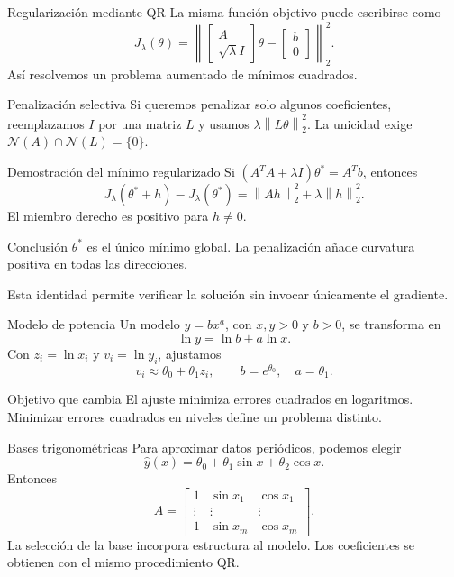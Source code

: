 \documentclass[aspectratio=169,12pt]{beamer}
\newcommand{\mat}[1]{\begin{bmatrix}#1\end{bmatrix}}
\newcommand{\norm}[1]{\left\lVert#1\right\rVert}
\begin{document}
\begin{frame}{Regularización mediante QR}
La misma función objetivo puede escribirse como
\[
J_\lambda(\theta)
=\left\lVert
\mat{A\\\sqrt\lambda I}\theta-\mat{b\\0}
\right\rVert_2^2.
\]
Así resolvemos un problema aumentado de mínimos cuadrados.
\begin{block}{Penalización selectiva}
Si queremos penalizar solo algunos coeficientes, reemplazamos $I$ por una
matriz $L$ y usamos $\lambda\norm{L\theta}_2^2$.
La unicidad exige $\mathcal N(A)\cap\mathcal N(L)=\{0\}$.
\end{block}
\end{frame}

\begin{frame}{Demostración del mínimo regularizado}
Si $(A^TA+\lambda I)\theta^*=A^Tb$, entonces
\[
J_\lambda(\theta^*+h)-J_\lambda(\theta^*)
=\norm{Ah}_2^2+\lambda\norm{h}_2^2.
\]
El miembro derecho es positivo para $h\neq0$.
\begin{block}{Conclusión}
$\theta^*$ es el único mínimo global. La penalización añade curvatura positiva
en todas las direcciones.
\end{block}
Esta identidad permite verificar la solución sin invocar únicamente el gradiente.
\end{frame}

\begin{frame}{Modelo de potencia}
Un modelo $y=bx^a$, con $x,y>0$ y $b>0$, se transforma en
\[
\ln y=\ln b+a\ln x.
\]
Con $z_i=\ln x_i$ y $v_i=\ln y_i$, ajustamos
\[
v_i\approx\theta_0+\theta_1z_i,
\qquad b=e^{\theta_0},\quad a=\theta_1.
\]
\begin{block}{Objetivo que cambia}
El ajuste minimiza errores cuadrados en logaritmos.
Minimizar errores cuadrados en niveles define un problema distinto.
\end{block}
\end{frame}

\begin{frame}{Bases trigonométricas}
Para aproximar datos periódicos, podemos elegir
\[
\widehat y(x)=\theta_0+\theta_1\sin x+\theta_2\cos x.
\]
Entonces
\[
A=\mat{1&\sin x_1&\cos x_1\\\vdots&\vdots&\vdots\\1&\sin x_m&\cos x_m}.
\]
La selección de la base incorpora estructura al modelo.
Los coeficientes se obtienen con el mismo procedimiento QR.
\end{frame}
\end{document}
